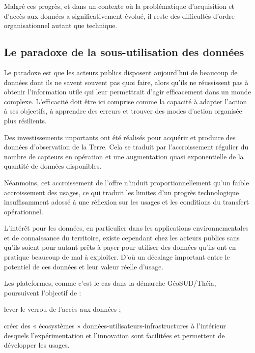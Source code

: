 Malgré ces progrès, et dans un contexte où la problématique d'acquisition et
d'accès aux données a significativement évolué, il reste des difficultés
d'ordre organisationnel autant que technique.


\subsection[constats:paradoxe_donnees]
{Le paradoxe de la sous-utilisation des données}

Le paradoxe est que les acteurs publics disposent aujourd'hui de beaucoup de données dont
ils ne savent souvent pas quoi faire, alors qu'ils ne
réussissent pas à obtenir l'information utile qui leur permettrait d'agir
efficacement dans un monde complexe. L'efficacité doit être
ici comprise comme la capacité à adapter l'action à ses objectifs, à apprendre
des erreurs et trouver des modes d'action organisée plus résilients.

Des investissements importants ont été réalisés pour acquérir
et produire des données d'observation de la Terre.
Cela se traduit par l'accroissement régulier du
nombre de capteurs en opération et une augmentation quasi exponentielle
de la quantité de données disponibles.

Néanmoins, cet accroissement de l'offre n'induit proportionnellement qu'un
faible accroissement des usages, ce qui traduit les limites d'un progrès
technologique insuffisamment adossé à une réflexion sur les usages et les
conditions du transfert opérationnel.

L'intérêt pour les données, en particulier dans les applications
environnementales et de connaissance du territoire, existe cependant chez les
acteurs publics sans qu'ils soient pour autant prêts à payer pour utiliser des
données qu'ils ont en pratique beaucoup de mal à exploiter. D'où un décalage
important entre le potentiel de ces données et leur valeur réelle d’usage.

Les plateformes, comme c'est le cas dans la démarche GéoSUD/Théia, poursuivent
l'objectif de :

\startitemize

\item lever le verrou de l'accès aux données ;

\item créer des « écosystèmes » données-utilisateurs-infrastructures à l'intérieur
desquels l'expérimentation et l'innovation sont facilitées et permettent de
développer les usages.

